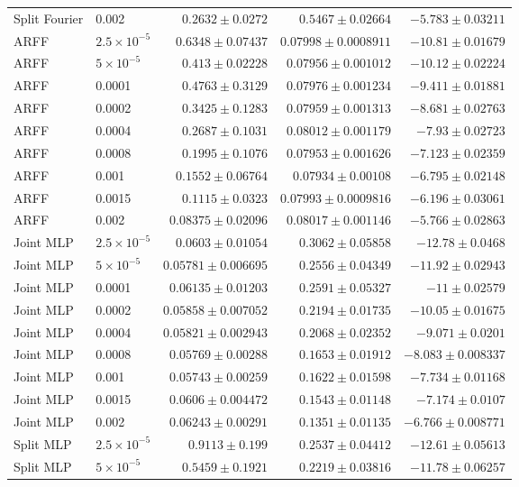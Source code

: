 \begin{longtable}{llrrr}
Split Fourier & 0.002 & $0.2632\pm 0.0272$ & $0.5467\pm 0.02664$ & $-5.783\pm 0.03211$\\
ARFF & $2.5\times10^{-5}$ & $0.6348\pm 0.07437$ & $0.07998\pm 0.0008911$ & $-10.81\pm 0.01679$\\
ARFF & $5\times10^{-5}$ & $0.413\pm 0.02228$ & $0.07956\pm 0.001012$ & $-10.12\pm 0.02224$\\
ARFF & 0.0001 & $0.4763\pm 0.3129$ & $0.07976\pm 0.001234$ & $-9.411\pm 0.01881$\\
ARFF & 0.0002 & $0.3425\pm 0.1283$ & $0.07959\pm 0.001313$ & $-8.681\pm 0.02763$\\
ARFF & 0.0004 & $0.2687\pm 0.1031$ & $0.08012\pm 0.001179$ & $-7.93\pm 0.02723$\\
ARFF & 0.0008 & $0.1995\pm 0.1076$ & $0.07953\pm 0.001626$ & $-7.123\pm 0.02359$\\
ARFF & 0.001 & $0.1552\pm 0.06764$ & $0.07934\pm 0.00108$ & $-6.795\pm 0.02148$\\
ARFF & 0.0015 & $0.1115\pm 0.0323$ & $0.07993\pm 0.0009816$ & $-6.196\pm 0.03061$\\
ARFF & 0.002 & $0.08375\pm 0.02096$ & $0.08017\pm 0.001146$ & $-5.766\pm 0.02863$\\
Joint MLP & $2.5\times10^{-5}$ & $0.0603\pm 0.01054$ & $0.3062\pm 0.05858$ & $-12.78\pm 0.0468$\\
Joint MLP & $5\times10^{-5}$ & $0.05781\pm 0.006695$ & $0.2556\pm 0.04349$ & $-11.92\pm 0.02943$\\
Joint MLP & 0.0001 & $0.06135\pm 0.01203$ & $0.2591\pm 0.05327$ & $-11\pm 0.02579$\\
Joint MLP & 0.0002 & $0.05858\pm 0.007052$ & $0.2194\pm 0.01735$ & $-10.05\pm 0.01675$\\
Joint MLP & 0.0004 & $0.05821\pm 0.002943$ & $0.2068\pm 0.02352$ & $-9.071\pm 0.0201$\\
Joint MLP & 0.0008 & $0.05769\pm 0.00288$ & $0.1653\pm 0.01912$ & $-8.083\pm 0.008337$\\
Joint MLP & 0.001 & $0.05743\pm 0.00259$ & $0.1622\pm 0.01598$ & $-7.734\pm 0.01168$\\
Joint MLP & 0.0015 & $0.0606\pm 0.004472$ & $0.1543\pm 0.01148$ & $-7.174\pm 0.0107$\\
Joint MLP & 0.002 & $0.06243\pm 0.00291$ & $0.1351\pm 0.01135$ & $-6.766\pm 0.008771$\\
Split MLP & $2.5\times10^{-5}$ & $0.9113\pm 0.199$ & $0.2537\pm 0.04412$ & $-12.61\pm 0.05613$\\
Split MLP & $5\times10^{-5}$ & $0.5459\pm 0.1921$ & $0.2219\pm 0.03816$ & $-11.78\pm 0.06257$\\

\end{longtable}

